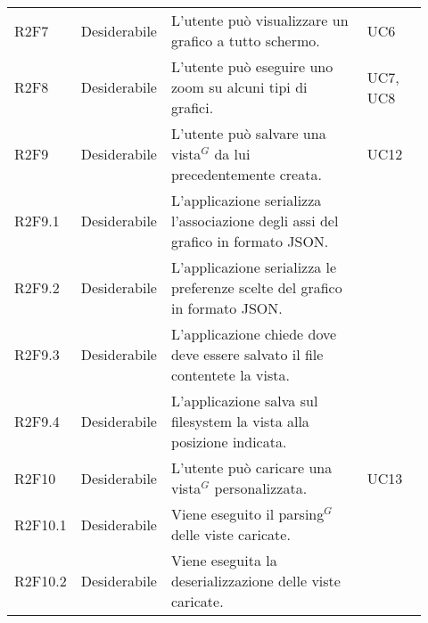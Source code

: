 {\begin{longtable}{p{0.12\linewidth}p{0.15\linewidth}p{0.50\linewidth}p{0.15\linewidth}}
    \rowcolor[RGB]{233, 245, 206}
    R2F7 & Desiderabile & L'utente può visualizzare un grafico a tutto schermo. & UC6\\
    \rowcolor[RGB]{233, 245, 206}
    R2F8 & Desiderabile & L'utente può eseguire uno zoom su alcuni tipi di grafici. & UC7, UC8\\
    \rowcolor[RGB]{216, 235, 171}
    R2F9 & Desiderabile & L'utente può salvare una vista$^{G}$ da lui precedentemente creata. & UC12\\
    \rowcolor[RGB]{233, 245, 206}
    R2F9.1 & Desiderabile & L'applicazione serializza l'associazione degli assi del grafico in formato JSON.& \\
    \rowcolor[RGB]{216, 235, 171}
    R2F9.2 & Desiderabile & L'applicazione serializza le preferenze scelte del grafico in formato JSON.& \\
    \rowcolor[RGB]{233, 245, 206}
    R2F9.3 & Desiderabile & L'applicazione chiede dove deve essere salvato il file  contentete la vista.& \\
    \rowcolor[RGB]{216, 235, 171}
    R2F9.4 & Desiderabile & L'applicazione salva sul filesystem la vista alla posizione indicata.& \\

    \rowcolor[RGB]{233, 245, 206}
    R2F10 & Desiderabile & L'utente può caricare una vista$^{G}$ personalizzata.  & UC13\\
    \rowcolor[RGB]{216, 235, 171}
    R2F10.1 & Desiderabile & Viene eseguito il parsing$^{G}$ delle viste caricate. & \\
    \rowcolor[RGB]{233, 245, 206}
    R2F10.2 & Desiderabile & Viene eseguita la deserializzazione delle viste caricate. & \\


\end{longtable}}
